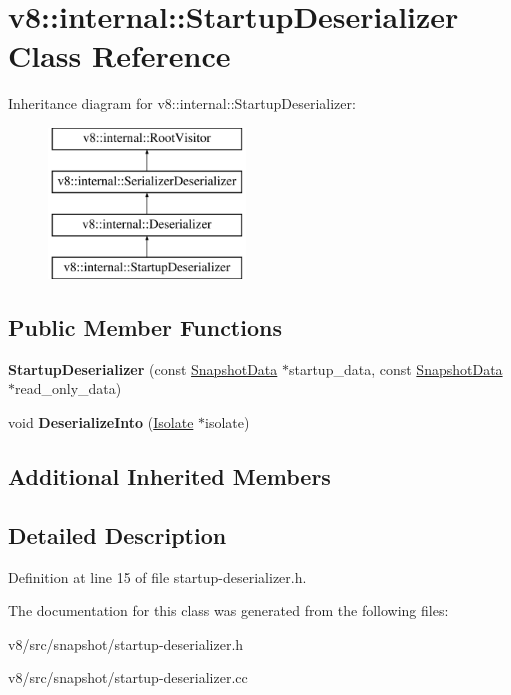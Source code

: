 \hypertarget{classv8_1_1internal_1_1StartupDeserializer}{}\section{v8\+:\+:internal\+:\+:Startup\+Deserializer Class Reference}
\label{classv8_1_1internal_1_1StartupDeserializer}
Inheritance diagram for v8\+:\+:internal\+:\+:Startup\+Deserializer\+:\begin{figure}[H]
\begin{center}
\leavevmode
\includegraphics[height=4.000000cm]{classv8_1_1internal_1_1StartupDeserializer}
\end{center}
\end{figure}
\subsection*{Public Member Functions}
\begin{DoxyCompactItemize}
\item 
\mbox{\label{classv8_1_1internal_1_1StartupDeserializer_a7e44cd452a53070109fd5713903c7bc9}} 
{\bfseries Startup\+Deserializer} (const \mbox{\hyperlink{classv8_1_1internal_1_1SnapshotData}{Snapshot\+Data}} $\ast$startup\+\_\+data, const \mbox{\hyperlink{classv8_1_1internal_1_1SnapshotData}{Snapshot\+Data}} $\ast$read\+\_\+only\+\_\+data)
\item 
\mbox{\label{classv8_1_1internal_1_1StartupDeserializer_a2d31ac36e9c125e5e94acd853bcd89a1}} 
void {\bfseries Deserialize\+Into} (\mbox{\hyperlink{classv8_1_1internal_1_1Isolate}{Isolate}} $\ast$isolate)
\end{DoxyCompactItemize}
\subsection*{Additional Inherited Members}


\subsection{Detailed Description}


Definition at line 15 of file startup-\/deserializer.\+h.



The documentation for this class was generated from the following files\+:\begin{DoxyCompactItemize}
\item 
v8/src/snapshot/startup-\/deserializer.\+h\item 
v8/src/snapshot/startup-\/deserializer.\+cc\end{DoxyCompactItemize}
